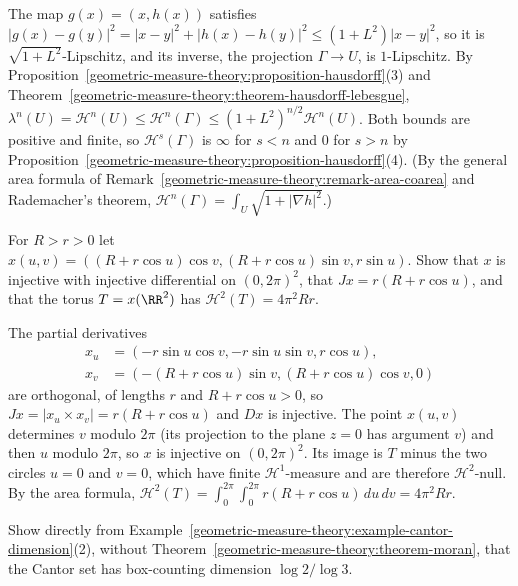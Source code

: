 \begin{solution}
The map $g(x) = (x, h(x))$ satisfies $|g(x) - g(y)|^2 = |x - y|^2 + |h(x) - h(y)|^2 \leq (1 + L^2)|x - y|^2$, so it is $\sqrt{1 + L^2}$-Lipschitz, and its inverse, the projection
$\Gamma \to U$, is $1$-Lipschitz. By Proposition~\ref{geometric-measure-theory:proposition-hausdorff}(3) and Theorem~\ref{geometric-measure-theory:theorem-hausdorff-lebesgue},
$\lambda^n(U) = \mathcal{H}^n(U) \leq \mathcal{H}^n(\Gamma) \leq (1 + L^2)^{n/2}\mathcal{H}^n(U)$. Both bounds are positive and finite, so $\mathcal{H}^s(\Gamma)$ is $\infty$ for $s < n$ and $0$ for
$s > n$ by Proposition~\ref{geometric-measure-theory:proposition-hausdorff}(4). (By the general area formula of Remark~\ref{geometric-measure-theory:remark-area-coarea} and Rademacher's theorem,
$\mathcal{H}^n(\Gamma) = \int_U\sqrt{1 + |\nabla h|^2}$.)
\end{solution}

\begin{exercise}\label{geometric-measure-theory:exercise-torus-area}
For $R > r > 0$ let $x(u, v) = ((R + r\cos u)\cos v, (R + r\cos u)\sin v, r\sin u)$. Show that $x$ is injective with injective differential on $(0, 2\pi)^2$, that $Jx = r(R + r\cos u)$, and that
the torus $T = x(\RR^2)$ has $\mathcal{H}^2(T) = 4\pi^2Rr$.
\end{exercise}

\begin{solution}
The partial derivatives
\[\begin{aligned}
x_u &= (-r\sin u\cos v, -r\sin u\sin v, r\cos u), \\
x_v &= (-(R + r\cos u)\sin v, (R + r\cos u)\cos v, 0)
\end{aligned}\]
are orthogonal, of lengths $r$ and $R + r\cos u > 0$, so
$Jx = |x_u \times x_v| = r(R + r\cos u)$ and $Dx$ is injective. The point $x(u, v)$ determines $v$ modulo $2\pi$ (its projection to the plane $z = 0$ has argument $v$) and then $u$ modulo
$2\pi$, so $x$ is injective on $(0, 2\pi)^2$. Its image is $T$ minus the two circles $u = 0$ and $v = 0$, which have finite $\mathcal{H}^1$-measure and are therefore $\mathcal{H}^2$-null. By the area
formula, $\mathcal{H}^2(T) = \int_0^{2\pi}\int_0^{2\pi}r(R + r\cos u)\,du\,dv = 4\pi^2Rr$.
\end{solution}

\begin{exercise}\label{geometric-measure-theory:exercise-box-cantor}
Show directly from Example~\ref{geometric-measure-theory:example-cantor-dimension}(2), without Theorem~\ref{geometric-measure-theory:theorem-moran}, that the Cantor set has box-counting dimension $\log 2/\log 3$.
\end{exercise}

